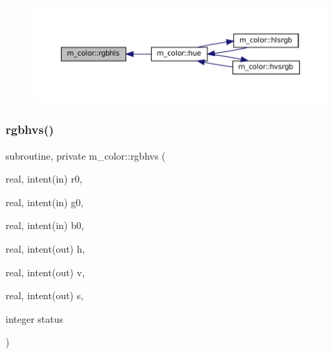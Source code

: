 \begin{figure}[H]
\begin{center}
\leavevmode
\includegraphics[width=350pt]{namespacem__color_a1dd027cbe65112af243d26195b1fc49a_icgraph}
\end{center}
\end{figure}
\mbox{\label{namespacem__color_a76f00e1d418c4904a963094bc730a0e6}} 
\subsubsection{\texorpdfstring{rgbhvs()}{rgbhvs()}}
{\footnotesize\ttfamily subroutine, private m\+\_\+color\+::rgbhvs (\begin{DoxyParamCaption}\item[{real, intent(in)}]{r0,  }\item[{real, intent(in)}]{g0,  }\item[{real, intent(in)}]{b0,  }\item[{real, intent(out)}]{h,  }\item[{real, intent(out)}]{v,  }\item[{real, intent(out)}]{s,  }\item[{integer}]{status }\end{DoxyParamCaption})\hspace{0.3cm}{\ttfamily [private]}}


